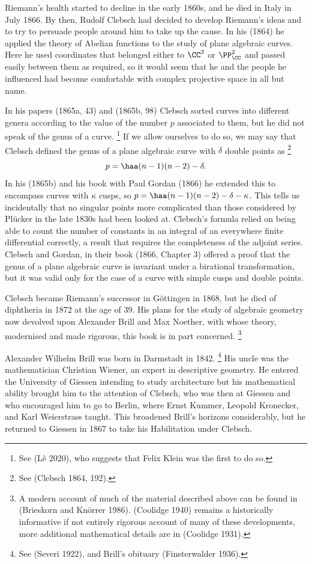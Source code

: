 Riemann's health started to decline in the early 1860s, and he  died
in Italy in July 1866. By then, Rudolf Clebsch had decided to develop
Riemann's ideas and to try to persuade people around him to take up the
cause. In his (1864) he  applied the theory of Abelian functions to the
study of plane algebraic curves. Here he used coordinates that belonged
either to $\CC^2$ or $\PP_{\CC}^2$ and  passed easily between them as
required, so it would seem that he and the people he influenced had
become comfortable with complex projective space in all but name.

In his papers (1865a, 43) and (1865b, 98) Clebsch sorted curves into
different genera according to the value of the number $p$ associated
to them, but he did not speak of the genus of a curve.%
%
\footnote{See
(L\^e 2020), who suggests that Felix Klein was the first to do so.} 
%
If
we allow ourselves to do so, we may say that Clebsch defined the genus
of a plane algebraic curve with $\delta$ double points as%
%
\footnote{See (Clebsch 1864, 192).}
%
$$p = \haa (n-1)(n-2) - \delta.$$
In his (1865b) and his book with Paul Gordan (1866) he extended this to
encompass curves with
$\kappa$ cusps, so $p= \haa (n-1)(n-2) - \delta - \kappa$. This tells
us incidentally that no singular points more complicated than those
considered by Pl\"ucker in the late 1830s had been looked at. Clebsch's
formula relied on being able to count the number of constants in an
integral of an everywhere finite differential correctly, a result that
requires the  completeness of the adjoint series. Clebsch and Gordan,
in their book (1866, Chapter 3) offered a proof that the genus of a plane
algebraic curve is invariant under a birational transformation, but it was
valid only for the case of a curve with simple cusps and double points.


Clebsch became   Riemann's successor in G\"ottingen in 1868, but  he
died of diphtheria in 1872 at the age of 39. His plans for the study of
algebraic geometry now devolved upon Alexander Brill and Max Noether,
with whose theory, modernised and made rigorous,  this book is in part
concerned.%
%
\footnote{A modern account of  much of the material described
above can be found in (Brieskorn and Kn\"orrer 1986). (Coolidge 1940)
remains a historically informative if not entirely rigorous account of
many of these developments, more additional mathematical details are in
(Coolidge 1931).}

Alexander Wilhelm Brill was born in Darmstadt in 1842.%
%
\footnote{See
(Severi 1922),  and Brill's obituary (Finsterwalder 1936).}
%
His  uncle was
the mathematician Christian Wiener, an expert in descriptive geometry. He
entered the University of Giessen intending to study architecture but his
mathematical ability brought him to the attention of Clebsch, who was then
at Giessen and who encouraged him to go  to Berlin, where  Ernst Kummer,
Leopold Kronecker, and Karl Weierstrass taught. This broadened Brill's
horizons considerably, but he returned to Giessen in 1867 to take his
Habilitation  under Clebsch.

